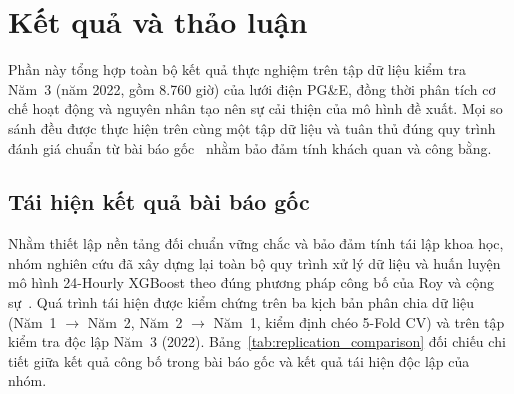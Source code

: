 \section{Kết quả và thảo luận}
\label{sec:results_and_discussion}

Phần này tổng hợp toàn bộ kết quả thực nghiệm trên tập dữ liệu kiểm tra Năm~3 (năm 2022, gồm 8.760 giờ) của lưới điện PG\&E, đồng thời phân tích cơ chế hoạt động và nguyên nhân tạo nên sự cải thiện của mô hình đề xuất. Mọi so sánh đều được thực hiện trên cùng một tập dữ liệu và tuân thủ đúng quy trình đánh giá chuẩn từ bài báo gốc~\cite{roy2025hourly} nhằm bảo đảm tính khách quan và công bằng.

\subsection{Tái hiện kết quả bài báo gốc}
\label{sec:replicate_result}

Nhằm thiết lập nền tảng đối chuẩn vững chắc và bảo đảm tính tái lập khoa học, nhóm nghiên cứu đã xây dựng lại toàn bộ quy trình xử lý dữ liệu và huấn luyện mô hình 24-Hourly XGBoost theo đúng phương pháp công bố của Roy và cộng sự~\cite{roy2025hourly}. Quá trình tái hiện được kiểm chứng trên ba kịch bản phân chia dữ liệu (Năm~1 $\to$ Năm~2, Năm~2 $\to$ Năm~1, kiểm định chéo 5-Fold CV) và trên tập kiểm tra độc lập Năm~3 (2022). Bảng~\ref{tab:replication_comparison} đối chiếu chi tiết giữa kết quả công bố trong bài báo gốc và kết quả tái hiện độc lập của nhóm.


